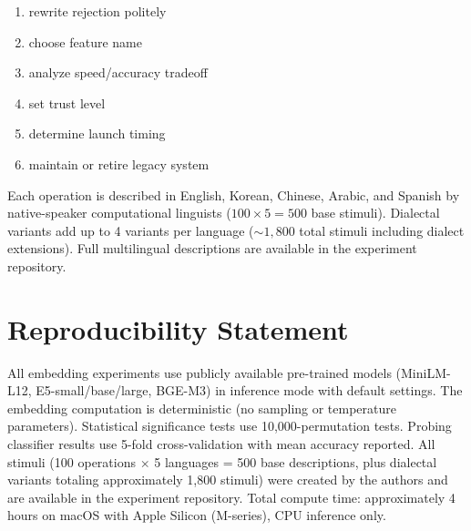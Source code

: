 \documentclass{article}
\theoremstyle{definition}
\begin{document}
\begin{enumerate}[nosep]
\item rewrite rejection politely \item choose feature name \item analyze speed/accuracy tradeoff \item set trust level \item determine launch timing \item maintain or retire legacy system
\end{enumerate}
\normalsize

Each operation is described in English, Korean, Chinese, Arabic, and Spanish by native-speaker computational linguists ($100 \times 5 = 500$ base stimuli). Dialectal variants add up to 4 variants per language (${\sim}1{,}800$ total stimuli including dialect extensions). Full multilingual descriptions are available in the experiment repository.


\section*{Reproducibility Statement}

All embedding experiments use publicly available pre-trained models (MiniLM-L12, E5-small/base/large, BGE-M3) in inference mode with default settings. The embedding computation is deterministic (no sampling or temperature parameters). Statistical significance tests use 10,000-permutation tests. Probing classifier results use 5-fold cross-validation with mean accuracy reported. All stimuli (100 operations $\times$ 5 languages = 500 base descriptions, plus dialectal variants totaling approximately 1,800 stimuli) were created by the authors and are available in the experiment repository. Total compute time: approximately 4 hours on macOS with Apple Silicon (M-series), CPU inference only.
\end{document}

